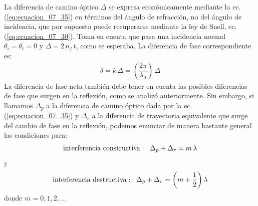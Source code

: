 \documentclass[14pt]{extarticle}
\begin{document}
La diferencia de camino óptico $\Delta$ se expresa económicamente mediante la ec. (\ref{eq:ecuacion_07_35}) en términos del ángulo de refracción, no del ángulo de incidencia, que por supuesto puede recuperarse mediante la ley de Snell, ec. (\ref{eq:ecuacion_07_30}). Toma en cuenta que para una incidencia normal $\theta_{i} = \theta_{t} = 0$ y $\Delta = 2 \, n_{f} \, t$, como se esperaba. La diferencia de fase correspondiente es:
\begin{align*}
\delta = k \, \Delta = \left( \dfrac{2 \pi}{\lambda_{0}} \right) \, \Delta
\end{align*}
La diferencia de fase neta también debe tener en cuenta las posibles diferencias de fase que surgen en la reflexión, como se analizó anteriormente. Sin embargo, si llamamos $\Delta_{p}$ a la diferencia de camino óptico dada por la ec. (\ref{eq:ecuacion_07_35}) y $\Delta_{r}$ a la diferencia de trayectoria equivalente que surge del cambio de fase en la reflexión, podemos enunciar de manera bastante general las condiciones para:
\begin{align}
\text{interferencia constructiva}: \hspace{0.2cm} \Delta_{p} + \Delta_{r} = m \, \lambda
\label{eq:ecuacion_07_36}
\end{align}
y
\begin{align}
\text{interferencia destructiva}: \hspace{0.2cm} \Delta_{p} + \Delta_{r} = \left( m + \dfrac{1}{2} \right) \lambda
\label{eq:ecuacion_07_37}
\end{align}
donde $m = 0, 1, 2, \ldots$
\end{document}
